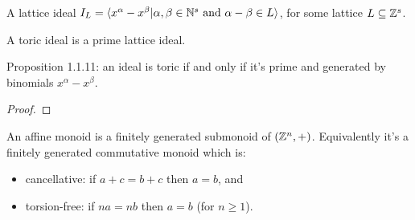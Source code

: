 \begin{definition}
  \label{AddMonoidAlgebra.IsToricIdeal}
  \leanok
  A lattice ideal \(I_L = \langle x^\alpha - x^\beta |  \alpha, \beta \in {\mathbb N}^s \text{ and } \alpha - \beta \in L\rangle\), for some lattice \(L \subseteq {\mathbb Z}^s\).

  A toric ideal is a prime lattice ideal.
\end{definition}

\begin{proposition}
  \label{AddMonoidAlgebra.isToricIdeal_iff_exists_span_single_sub_single}
  Proposition 1.1.11: an ideal is toric if and only if it's prime and generated by binomials \(x^\alpha - x^\beta\).
\end{proposition}
\begin{proof}
\end{proof}

\begin{definition}
  \label{affSemi}
  An affine monoid is a finitely generated submonoid of \(({\mathbb Z}^n, +)\). Equivalently it's a finitely generated commutative monoid which is:
  \begin{itemize}
    \item cancellative: if \(a + c = b + c\) then \(a = b\), and
    \item torsion-free: if \(n a = n b\) then \(a = b\) (for \(n \geq 1\)).
  \end{itemize}
\end{definition}

